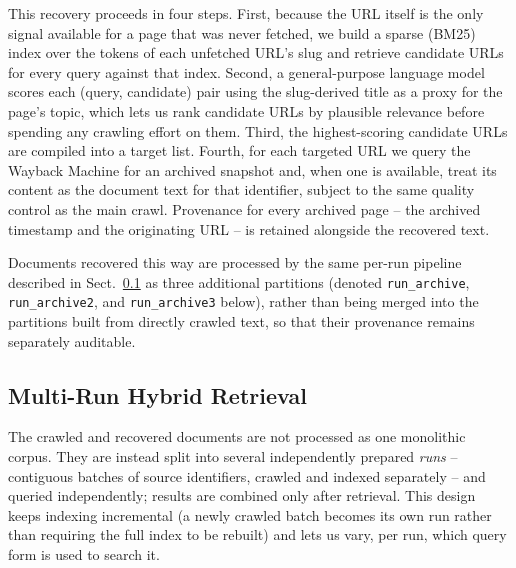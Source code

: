 \documentclass[runningheads]{llncs}
\begin{document}
This recovery proceeds in four steps. First, because the URL itself is the
only signal available for a page that was never fetched, we build a sparse
(BM25) index over the tokens of each unfetched URL's slug and retrieve
candidate URLs for every query against that index. Second, a general-purpose
language model scores each (query, candidate) pair using the slug-derived
title as a proxy for the page's topic, which lets us rank candidate URLs by
plausible relevance before spending any crawling effort on them. Third, the
highest-scoring candidate URLs are compiled into a target list. Fourth, for
each targeted URL we query the Wayback Machine for an archived snapshot and,
when one is available, treat its content as the document text for that
identifier, subject to the same quality control as the main crawl.
Provenance for every archived page -- the archived timestamp and the
originating URL -- is retained alongside the recovered text.

Documents recovered this way are processed by the same per-run pipeline
described in Sect.~\ref{sec:module1} as three additional partitions
(denoted \texttt{run\_archive}, \texttt{run\_archive2}, and
\texttt{run\_archive3} below), rather than being merged into the partitions
built from directly crawled text, so that their provenance remains
separately auditable.

\subsection{Multi-Run Hybrid Retrieval}
\label{sec:module1}

The crawled and recovered documents are not processed as one monolithic
corpus. They are instead split into several independently prepared
\emph{runs} -- contiguous batches of source identifiers, crawled and indexed
separately -- and queried independently; results are combined only after
retrieval. This design keeps indexing incremental (a newly crawled batch
becomes its own run rather than requiring the full index to be rebuilt) and
lets us vary, per run, which query form is used to search it.
\end{document}
